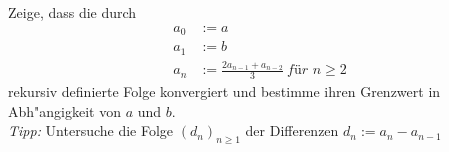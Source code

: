 \begin{prob}
  Zeige, dass die durch
  \begin{equation*}
    \begin{split}
      a_0 &:= a \\
      a_1 &:= b \\
      a_n &:= \frac{2a_{n-1} + a_{n-2}}{3}\ \textit{für } n \geq 2
    \end{split}
  \end{equation*}
  rekursiv definierte Folge konvergiert und bestimme ihren Grenzwert in
  Abh"angigkeit von $a$ und $b$.\\
  \textit{Tipp:} Untersuche die Folge $(d_n)_{n \geq 1}$ der Differenzen
  $d_n:= a_n - a_{n-1}$
\end{prob}
